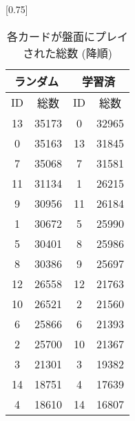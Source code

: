 \documentclass[twocolumn]{jarticle}     %
\begin{document}
       \begin{table}[t]
         \begin{minipage}{0.50\hsize}
           \centering
           \caption{各カードが盤面にプレイされた総数 (降順)}
            \vspace{-0.3cm}
            \label{table:cardcount}
           \scalebox{0.75}[0.75]{
           \begin{tabular}{|cc|cc|}
             \hline
             \multicolumn{2}{|c|}{ランダム}       & \multicolumn{2}{c|}{学習済}       \\ \hline
             \multicolumn{1}{|c|}{ID} & 総数    & \multicolumn{1}{c|}{ID} & 総数   \\ \hline \hline
             \multicolumn{1}{|c|}{13}  & 35173 & \multicolumn{1}{c|}{0}  & 32965 \\ \hline
             \multicolumn{1}{|c|}{0}  & 35163 & \multicolumn{1}{c|}{13} & 31845 \\ \hline
             \multicolumn{1}{|c|}{7}  & 35068 & \multicolumn{1}{c|}{7}  & 31581 \\ \hline
             \multicolumn{1}{|c|}{11} & 31134 & \multicolumn{1}{c|}{1}  & 26215 \\ \hline
             \multicolumn{1}{|c|}{9} & 30956 & \multicolumn{1}{c|}{11} & 26184 \\ \hline
             \multicolumn{1}{|c|}{1}  & 30672 & \multicolumn{1}{c|}{5}  & 25990 \\ \hline
             \multicolumn{1}{|c|}{5}  & 30401 & \multicolumn{1}{c|}{8}  & 25986 \\ \hline
             \multicolumn{1}{|c|}{8}  & 30386 & \multicolumn{1}{c|}{9}  & 25697 \\ \hline
             \multicolumn{1}{|c|}{12} & 26558 & \multicolumn{1}{c|}{12}  & 21763 \\ \hline
             \multicolumn{1}{|c|}{10} & 26521 & \multicolumn{1}{c|}{2}  & 21560 \\ \hline
             \multicolumn{1}{|c|}{6}  & 25866 & \multicolumn{1}{c|}{6} & 21393 \\ \hline
             \multicolumn{1}{|c|}{2}  & 25700 & \multicolumn{1}{c|}{10}  & 21367 \\ \hline
             \multicolumn{1}{|c|}{3} & 21301 & \multicolumn{1}{c|}{3}  & 19382 \\ \hline
             \multicolumn{1}{|c|}{14}  & 18751 & \multicolumn{1}{c|}{4} & 17639 \\ \hline
             \multicolumn{1}{|c|}{4}  & 18610 & \multicolumn{1}{c|}{14} & 16807 \\ \hline

\end{tabular}}
\end{minipage}
\end{table}
\end{document}
